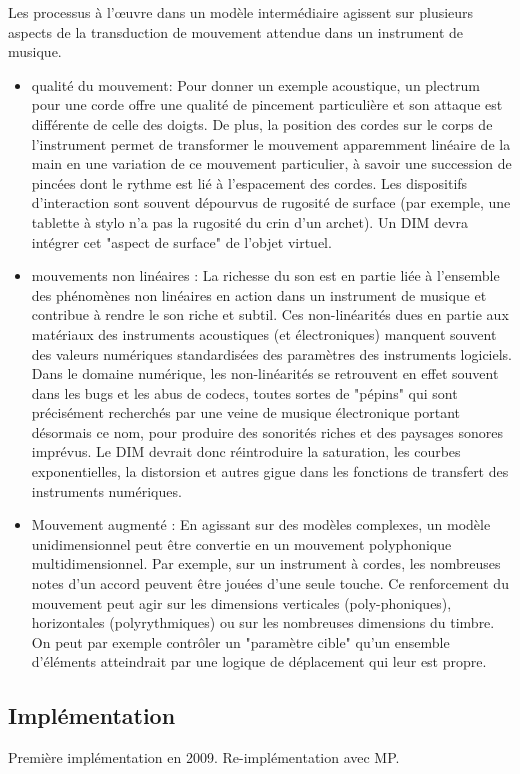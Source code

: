 Les processus à l'œuvre dans un modèle intermédiaire agissent sur plusieurs aspects de la transduction de mouvement attendue dans un instrument de musique.
\vspace{-1em}
\begin{itemize}[noitemsep]
	\item qualité du mouvement: Pour donner un exemple acoustique, un plectrum pour une corde
offre une qualité de pincement particulière et son attaque est différente de celle des doigts. De plus, la position des cordes sur le corps de l'instrument permet de transformer le mouvement apparemment linéaire de la main en une variation de ce mouvement particulier, à savoir une succession de pincées dont le rythme est lié à l'espacement des cordes. Les dispositifs d'interaction sont souvent dépourvus de rugosité de surface (par exemple, une tablette à stylo n'a pas la rugosité du crin d'un archet). Un DIM devra intégrer cet "aspect de surface" de l'objet virtuel.
	\item mouvements non linéaires : La richesse du son est en partie liée à l'ensemble des phénomènes non linéaires en action dans un instrument de musique et contribue à rendre le son riche et subtil. Ces non-linéarités dues en partie aux matériaux des instruments acoustiques (et électroniques) manquent souvent des valeurs numériques standardisées des paramètres des instruments logiciels. Dans le domaine numérique, les non-linéarités se retrouvent en effet souvent dans les bugs et les abus de codecs, toutes sortes de "pépins" qui sont précisément recherchés par une veine de musique électronique portant désormais ce nom, pour produire des sonorités riches et des paysages sonores imprévus. Le DIM devrait donc réintroduire la saturation, les courbes exponentielles, la distorsion et autres gigue dans les fonctions de transfert des instruments numériques. 
	\item Mouvement augmenté : En agissant sur des modèles complexes, un modèle unidimensionnel
peut être convertie en un mouvement polyphonique multidimensionnel. Par exemple, sur un instrument à cordes, les nombreuses notes d'un accord peuvent être jouées d'une seule touche. Ce renforcement du mouvement peut agir sur les dimensions verticales (poly-phoniques), horizontales (polyrythmiques) ou sur les nombreuses dimensions du timbre. On peut par exemple contrôler un "paramètre cible" qu'un ensemble d'éléments atteindrait par une logique de déplacement qui leur est propre.
\end{itemize}

\subsection{Implémentation}
Première implémentation en 2009.
Re-implémentation avec MP.

